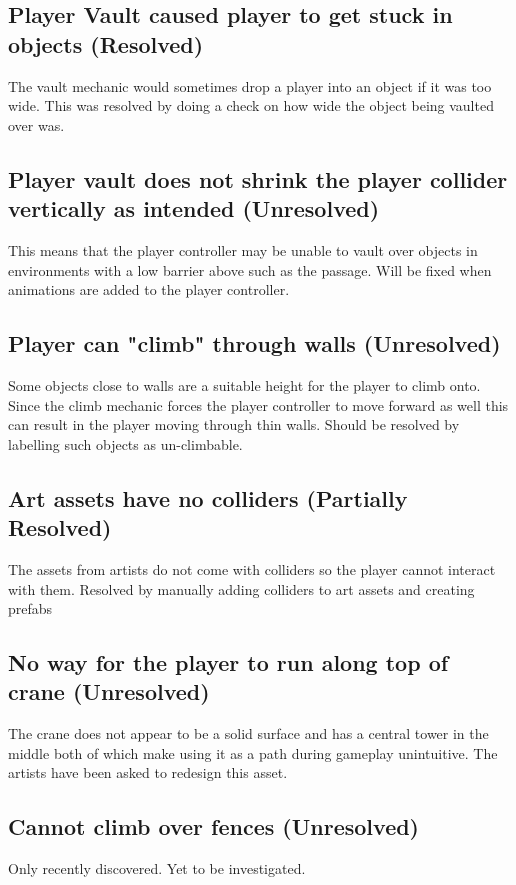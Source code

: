 \documentclass[a4paper,10pt]{article}
\begin{document}
\subsection{Player Vault caused player to get stuck in objects (Resolved)}
The vault mechanic would sometimes drop a player into an object if it was too wide. This was resolved by doing a check on how wide the object being vaulted over was.

\subsection{Player vault does not shrink the player collider vertically as intended (Unresolved)}
This means that the player controller may be unable to vault over objects in environments with a low barrier above such as the passage. Will be fixed when animations are added to the player controller.

\subsection{Player can "climb" through walls (Unresolved)}
Some objects close to walls are a suitable height for the player to climb onto. Since the climb mechanic forces the player controller to move forward as well this can result in the player moving through thin walls. Should be resolved by labelling such objects as un-climbable.

\subsection{Art assets have no colliders (Partially Resolved)}
The assets from artists do not come with colliders so the player cannot interact with them. Resolved by manually adding colliders to art assets and creating prefabs

\subsection{No way for the player to run along top of crane (Unresolved)}
The crane does not appear to be a solid surface and has a central tower in the middle both of which make using it as a path during gameplay unintuitive. The artists have been asked to redesign this asset.

\subsection{Cannot climb over fences (Unresolved)}
Only recently discovered. Yet to be investigated.
\end{document}
